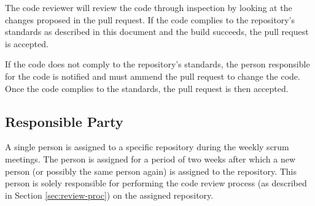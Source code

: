 \documentclass{article}
\begin{document}
    The code reviewer will review the code through inspection by looking at the
    changes proposed in the pull request. If the code complies to the
    repository's standards as described in this document and the build succeeds,
    the pull request is accepted.

    If the code does not comply to the repository's standards, the person
    responsible for the code is notified and must ammend the pull request to
    change the code. Once the code complies to the standards, the pull
    request is then accepted.

    \subsection{Responsible Party}
    \label{sec:review-party}

    A single person is assigned to a specific repository during the weekly scrum
    meetings. The person is assigned for a period of two weeks after which a new
    person (or possibly the same person again) is assigned to the repository.
    This person is solely responsible for performing the code review process (as
    described in Section \ref{sec:review-proc}) on the assigned repository.
\end{document}

